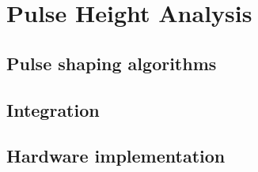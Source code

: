 \section{Pulse Height Analysis}
\subsection{Pulse shaping algorithms}
\subsection{Integration}
\subsection{Hardware implementation}